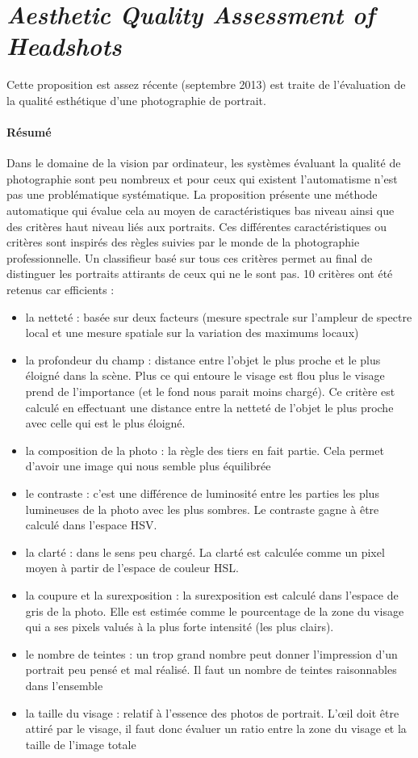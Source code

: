 \documentclass[11pt, french]{report-rd-info}
\begin{document}
\section{\emph{Aesthetic Quality Assessment of Headshots}}
Cette proposition \cite{Males2013} est assez récente (septembre 2013) est traite de l’évaluation de la qualité esthétique d’une photographie de portrait.
\paragraph{Résumé}
Dans le domaine de la vision par ordinateur, les systèmes évaluant la qualité de photographie sont peu nombreux et pour ceux qui existent l’automatisme n’est pas une problématique systématique. La proposition présente une méthode automatique qui évalue cela au moyen de caractéristiques bas niveau ainsi que des critères haut niveau liés aux portraits. Ces différentes caractéristiques ou critères sont inspirés des règles suivies par le monde de la photographie professionnelle.
Un classifieur basé sur tous ces critères permet au final de distinguer les portraits attirants de ceux qui ne le sont pas. 10 critères ont été retenus car efficients :
\begin{itemize}
\item la netteté : basée sur deux facteurs (mesure spectrale sur l’ampleur de spectre local et une mesure spatiale sur la variation des maximums locaux)
\item la profondeur du champ : distance entre l’objet le plus proche et le plus éloigné dans la scène. Plus ce qui entoure le visage est flou plus le visage prend de l’importance (et le fond nous parait moins chargé). Ce critère est calculé en effectuant une distance entre la netteté de l’objet le plus proche avec celle qui est le plus éloigné.
\item la composition de la photo : la règle des tiers en fait partie. Cela permet d’avoir une image qui nous semble plus équilibrée
\item le contraste : c’est une différence de luminosité entre les parties les plus lumineuses de la photo avec les plus sombres. Le contraste gagne à être calculé dans l’espace HSV.
\item la clarté : dans le sens peu chargé. La clarté est calculée comme un pixel moyen à partir de l’espace de couleur HSL.
\item la coupure et la surexposition : la surexposition est calculé dans l’espace de gris de la photo. Elle est estimée comme le pourcentage de la zone du visage qui a ses pixels valués à la plus forte intensité (les plus clairs).
\item  le nombre de teintes : un trop grand nombre peut donner l’impression d’un portrait peu pensé et mal réalisé. Il faut un nombre de teintes raisonnables dans l’ensemble
\item la taille du visage : relatif à l’essence des photos de portrait. L’œil doit être attiré par le visage, il faut donc évaluer un ratio entre la zone du visage et la taille de l’image totale
\end{itemize}
\end{document}
